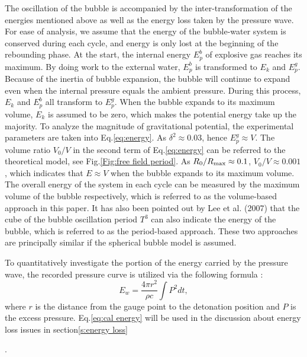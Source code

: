 \documentclass[%
 aip,
 amsmath,amssymb,
 reprint,%
]{revtex4-1}
\begin{document}
{{The oscillation of the bubble is accompanied by the inter-transformation of the energies mentioned above as well as the energy loss taken by the pressure wave. For ease of analysis, we assume that the energy of the bubble-water system is conserved during each cycle, and energy is only lost at the beginning of the rebounding phase. At the start, the internal energy $E_p^b$ of explosive gas reaches its maximum. By doing work to the external water, $E_p^b$ is transformed to $E_k$ and $E_p^g$.  Because of the inertia of bubble expansion, the bubble will continue to expand even when the internal pressure equals the ambient pressure. During this process, $E_k$ and $E_p^b$ all transform to $E_p^g$. When the bubble expands to its maximum volume, $E_k$ is assumed to be zero, which makes the potential energy take up the majority. To analyze the magnitude of gravitational potential, the experimental parameters are taken into Eq.\eqref{eq:energy}. As $\delta^2 \approx 0.03$, hence $E_p^g \approx V$. The volume ratio $V_0/V$ in the second term of Eq.\eqref{eq:energy} can be referred to the theoretical model, see Fig.\ref{Fig:free field period}. As $R_0/R_{\rm max} \approx 0.1$, $V_0/V \approx 0.001$, which indicates that $E \approx V$ when the bubble expands to its maximum volume. The overall energy of the system in each cycle can be measured by the maximum volume of the bubble respectively, which is referred to as the volume-based approach in this paper. It has also been pointed out by Lee et al.\cite{RN2622} (2007) that the cube of the bubble oscillation period $T^3$ can also indicate the energy of the bubble, which is referred to as the period-based approach. These two approaches are principally similar if the spherical bubble model is assumed. 

To quantitatively investigate the portion of the energy carried by the pressure wave, the recorded pressure curve is utilized via the following formula \citep{RN2475}:
\begin{equation}
\label{eq:cal energy}
E_w=\frac{4\pi r^2}{\rho c}\int P^2 dt,
\end{equation} where $r$ is the distance from the gauge point to the detonation position and $P$ is the excess pressure. Eq.\eqref{eq:cal energy} will be used in the discussion about energy loss issues in section\ref{s:energy loss}}.

}
\end{document}
